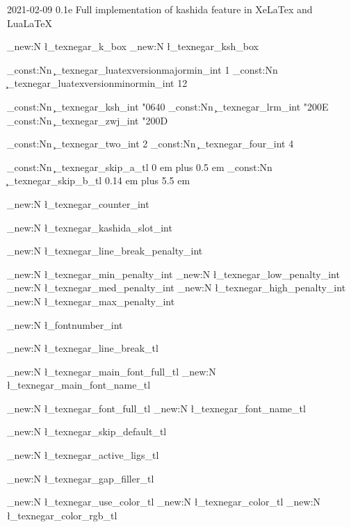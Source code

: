  {2021-02-09} {0.1e} { Full implementation of kashida feature in XeLaTex and LuaLaTeX }

\def\TeXNegar{\TeX Negar}

\box_new:N \l_texnegar_k_box
\box_new:N \l_texnegar_ksh_box

\tl_const:Nn \c_texnegar_luatexversionmajormin_int {1}
\tl_const:Nn \c_texnegar_luatexversionminormin_int {12}

\int_const:Nn \c_texnegar_ksh_int {"0640} %
\int_const:Nn \c_texnegar_lrm_int {"200E} %
\int_const:Nn \c_texnegar_zwj_int {"200D} %

\int_const:Nn \c_texnegar_two_int {2}
\int_const:Nn \c_texnegar_four_int {4}

\tl_const:Nn \c_texnegar_skip_a_tl { 0 em plus 0.5 em }
\tl_const:Nn \c_texnegar_skip_b_tl { 0.14 em plus 5.5 em }

\int_new:N \l_texnegar_counter_int

\int_new:N \l_texnegar_kashida_slot_int

\int_new:N \l_texnegar_line_break_penalty_int

\int_new:N \l_texnegar_min_penalty_int
\int_new:N \l_texnegar_low_penalty_int
\int_new:N \l_texnegar_med_penalty_int
\int_new:N \l_texnegar_high_penalty_int
\int_new:N \l_texnegar_max_penalty_int

\int_new:N \l_fontnumber_int

\tl_new:N \l_texnegar_line_break_tl

\tl_new:N \l_texnegar_main_font_full_tl
\tl_new:N \l_texnegar_main_font_name_tl

\tl_new:N \l_texnegar_font_full_tl
\tl_new:N \l_texnegar_font_name_tl

\tl_new:N \l_texnegar_skip_default_tl

\tl_new:N \l_texnegar_active_ligs_tl

\tl_new:N \l_texnegar_gap_filler_tl

\tl_new:N \l_texnegar_use_color_tl
\tl_new:N \l_texnegar_color_tl
\tl_new:N \l_texnegar_color_rgb_tl

